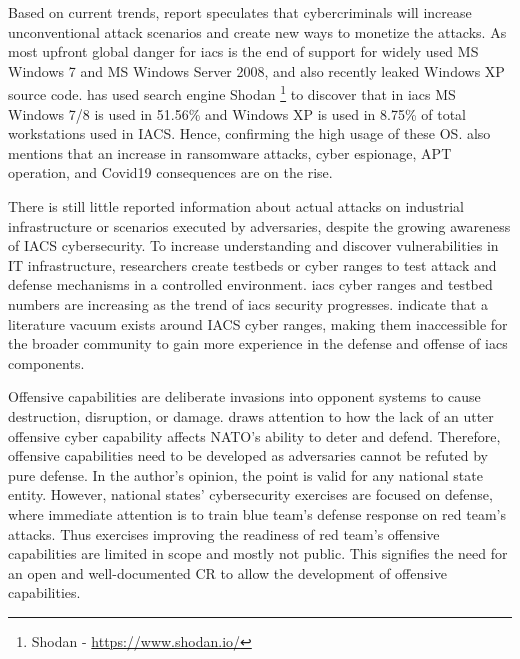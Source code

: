 Based on current trends, report  \parencite{66-kaspersky-thret-landscape} speculates that cybercriminals will increase unconventional attack scenarios and create new ways to monetize the attacks. As most upfront global danger for \gls*{iacs} is the end of support for widely used MS Windows 7 and MS Windows Server 2008, and also recently leaked Windows XP source code. \citeauthor{90-ics-statistics} \parencite{90-ics-statistics} has used search engine Shodan \footnote{Shodan - \url{https://www.shodan.io/}} to discover that in \gls*{iacs} MS Windows 7/8 is used in 51.56\% and Windows XP is used in 8.75\% of total workstations used in IACS. Hence, confirming the high usage of these OS. \citeauthor{66-kaspersky-thret-landscape} \parencite{66-kaspersky-thret-landscape} also mentions that an increase in ransomware attacks, cyber espionage, APT operation, and Covid19 consequences are on the rise.



There is still little reported information about actual attacks on industrial infrastructure or scenarios executed by adversaries, despite the growing awareness of IACS cybersecurity\parencite{72-ics-atack-taxonomy}. To increase understanding and discover vulnerabilities in IT infrastructure, researchers create testbeds or cyber ranges to test attack and defense mechanisms in a controlled environment. \gls*{iacs} cyber ranges and testbed numbers are increasing as the trend of \gls*{iacs} security progresses. \citeauthor{17-SCADA-testbed} \parencite{17-SCADA-testbed} indicate that a literature vacuum exists around IACS cyber ranges, making them inaccessible for the broader community to gain more experience in the defense and offense of \gls*{iacs} components.



Offensive capabilities are deliberate invasions into opponent systems to cause destruction, disruption, or damage. \citeauthor{53-NATO-role-of-offensi-cyber-capabilities} \parencite{53-NATO-role-of-offensi-cyber-capabilities} draws attention to how the lack of an utter offensive cyber capability affects NATO's ability to deter and defend. Therefore, offensive capabilities need to be developed as adversaries cannot be refuted by pure defense. In the author's opinion, the point is valid for any national state entity. However, national states' cybersecurity exercises are focused on defense, where immediate attention is to train blue team's defense response on red team's attacks. Thus exercises improving the readiness of red team's offensive capabilities are limited in scope and mostly not public. This signifies the need for an open and well-documented CR to allow the development of offensive capabilities.



